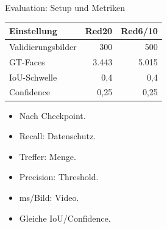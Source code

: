 \begin{frame}{Evaluation: Setup und Metriken}
\small
\begin{tabular}{l r r}
\toprule
Einstellung & Red20 & Red6/10 \\
\midrule
Validierungsbilder & 300 & 500 \\
GT-Faces & 3.443 & 5.015 \\
IoU-Schwelle & 0,4 & 0,4 \\
Confidence & 0,25 & 0,25 \\
\bottomrule
\end{tabular}
\vspace{0.4em}
\scriptsize
\begin{itemize}
    \item Nach Checkpoint.
    \item Recall: Datenschutz.
    \item Treffer: Menge.
    \item Precision: Threshold.
    \item ms/Bild: Video.
    \item Gleiche IoU/Confidence.
\end{itemize}
\end{frame}
